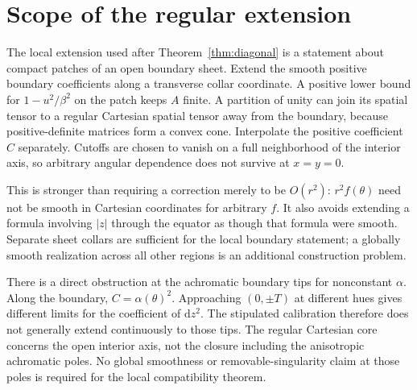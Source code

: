 \documentclass[9pt,twocolumn,twoside]{opticajnl}
\theoremstyle{plain}
\newcommand{\dd}{\mathrm{d}}
\begin{document}
\section{Scope of the regular extension}
\label{app:extension}
The local extension used after Theorem~\ref{thm:diagonal} is a statement about compact patches of an open boundary sheet. Extend the smooth positive boundary coefficients along a transverse collar coordinate. A positive lower bound for $1-u^2/\beta^2$ on the patch keeps $A$ finite. A partition of unity can join its spatial tensor to a regular Cartesian spatial tensor away from the boundary, because positive-definite matrices form a convex cone. Interpolate the positive coefficient $C$ separately. Cutoffs are chosen to vanish on a full neighborhood of the interior axis, so arbitrary angular dependence does not survive at $x=y=0$.

This is stronger than requiring a correction merely to be $O(r^2)$: $r^2f(\theta)$ need not be smooth in Cartesian coordinates for arbitrary $f$. It also avoids extending a formula involving $|z|$ through the equator as though that formula were smooth. Separate sheet collars are sufficient for the local boundary statement; a globally smooth realization across all other regions is an additional construction problem.

There is a direct obstruction at the achromatic boundary tips for nonconstant $\alpha$. Along the boundary, $C=\alpha(\theta)^2$. Approaching $(0,\pm T)$ at different hues gives different limits for the coefficient of $\dd z^2$. The stipulated calibration therefore does not generally extend continuously to those tips. The regular Cartesian core concerns the open interior axis, not the closure including the anisotropic achromatic poles. No global smoothness or removable-singularity claim at those poles is required for the local compatibility theorem.
\end{document}

